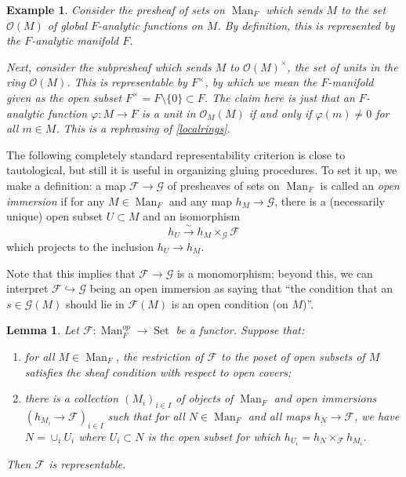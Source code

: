 \documentclass[12pt]{article}
\newtheorem{lemma}[theorem]{Lemma}
\newtheorem{example}[theorem]{Example}
\begin{document}
\begin{example}
Consider the presheaf of sets on $\operatorname{Man}_F$ which sends $M$ to the set $\mathcal{O}(M)$ of global $F$-analytic functions on $M$.  By definition, this is represented by the $F$-analytic manifold $F$.

Next, consider the subpresheaf which sends $M$ to $\mathcal{O}(M)^\times$, the set of units in the ring $\mathcal{O}(M)$.  This is representable by $F^\times$, by which we mean the $F$-manifold given as the open subset $F^\times =F\setminus \{0\}\subset F$.  The claim here is just that an $F$-analytic function $\varphi: M\rightarrow F$ is a unit in $\mathcal{O}_M(M)$ if and only if $\varphi(m)\neq 0$ for all $m\in M$.  This is a rephrasing of \ref{localrings}.
\end{example}


The following completely standard representability criterion is close to tautological, but still it is useful in organizing gluing procedures.  To set it up, we make a definition: a map $\mathcal{F}\rightarrow\mathcal{G}$ of presheaves of sets on $\operatorname{Man}_F$ is called an \emph{open immersion} if for any $M\in\operatorname{Man}_F$ and any map $h_M\rightarrow\mathcal{G}$, there is a (necessarily unique) open subset $U\subset M$ and an isomorphism
$$h_U\overset{\sim}{\rightarrow} h_M\times_{\mathcal{G}}\mathcal{F}$$
which projects to the inclusion $h_U\rightarrow h_M$.

Note that this implies that $\mathcal{F}\rightarrow\mathcal{G}$ is a monomorphism; beyond this, we can interpret $\mathcal{F}\hookrightarrow\mathcal{G}$ being an open immersion as saying that ``the condition that an $s\in\mathcal{G}(M)$ should lie in $\mathcal{F}(M)$ is an open condition (on $M$)''.

\begin{lemma}\label{localrep}
Let $\mathcal{F}:\operatorname{Man}_F^{op}\rightarrow\operatorname{Set}$ be a functor.  Suppose that:
\begin{enumerate}
\item for all $M\in\operatorname{Man}_F$, the restriction of $\mathcal{F}$ to the poset of open subsets of $M$ satisfies the sheaf condition with respect to open covers;
\item there is a collection $(M_i)_{i\in I}$ of objects of $\operatorname{Man}_F$ and open immersions $(h_{M_i}\rightarrow \mathcal{F})_{i\in I}$ such that for all $N\in\operatorname{Man}_F$ and all maps $h_N\rightarrow \mathcal{F}$, we have $N=\cup_i U_i$ where $U_i\subset N$ is the open subset for which $h_{U_i}=h_N\times_\mathcal{F}h_{M_i}$.
\end{enumerate}
Then $\mathcal{F}$ is representable.
\end{lemma}
\end{document}
